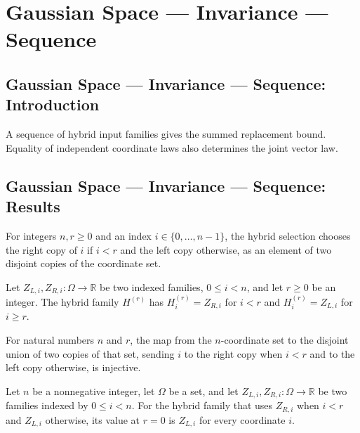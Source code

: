 \section{Gaussian Space --- Invariance --- Sequence}
\subsection*{Gaussian Space --- Invariance --- Sequence: Introduction}
A sequence of hybrid input families gives the summed replacement bound. Equality of independent coordinate laws also determines the joint vector law.

\subsection*{Gaussian Space --- Invariance --- Sequence: Results}

\begin{definition}
\leanok
For integers $n,r\ge0$ and an index $i\in\{0,\ldots,n-1\}$, the hybrid selection chooses the right copy of $i$ if $i<r$ and the left copy otherwise, as an element of two disjoint copies of the coordinate set.
\end{definition}

\begin{definition}
\leanok
{}
Let $Z_{L,i},Z_{R,i}\colon\Omega\to\mathbb R$ be two indexed families, $0\le i<n$, and let $r\ge0$ be an integer. The hybrid family $H^{(r)}$ has $H^{(r)}_i=Z_{R,i}$ for $i<r$ and $H^{(r)}_i=Z_{L,i}$ for $i\ge r$.
\end{definition}

\begin{lemma}
\leanok
{}
For natural numbers $n$ and $r$, the map from the $n$-coordinate set to the disjoint
union of two copies of that set, sending $i$ to the right copy when $i<r$ and to the
left copy otherwise, is injective.
\end{lemma}

\begin{lemma}
\leanok
{}
Let $n$ be a nonnegative integer, let $\Omega$ be a set, and let
$Z_{L,i},Z_{R,i}:\Omega\to\mathbb R$ be two families indexed by $0\le i<n$. For the
hybrid family that uses $Z_{R,i}$ when $i<r$ and $Z_{L,i}$ otherwise, its value at $r=0$
is $Z_{L,i}$ for every coordinate $i$.
\end{lemma}

